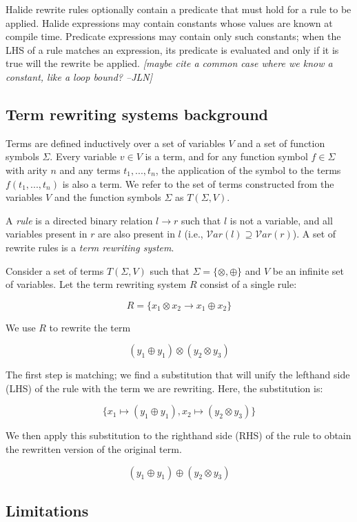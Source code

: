 \documentclass[sigplan,review,anonymous]{acmart}\settopmatter{printfolios=true,printccs=false,printacmref=false}
\newcommand{\jln}[1]{\textcolor{uwpurple}{\textit{[{#1} --JLN]}}}
\begin{document}
Halide rewrite rules optionally contain a predicate that must hold for a rule to be applied. Halide expressions may contain constants whose values are known at compile time. Predicate expressions may contain only such constants; when the LHS of a rule matches an expression, its predicate is evaluated and only if it is true will the rewrite be applied. \jln{maybe cite a common case where we know a constant, like a loop bound?}

\subsection{Term rewriting systems background}

Terms are defined inductively over a set of variables $V$ and a set of function symbols $\Sigma$. Every variable $v \in V$ is a term, and for any function symbol $f \in \Sigma$ with arity $n$ and any terms $t_1, ..., t_n$, the application of the symbol to the terms $f(t_1, ..., t_n)$ is also a term. We refer to the set of terms constructed from the variables $V$ and the function symbols $\Sigma$ as $T(\Sigma, V)$.

A \emph{rule} is a directed binary relation $l \rightarrow r$ such that $l$ is not a variable, and all variables present in $r$ are also present in $l$ (i.e., $\mathcal{V}ar(l) \supseteq \mathcal{V}ar(r)$). A set of rewrite rules is a \emph{term rewriting system}.

Consider a set of terms $T(\Sigma, V)$ such that $\Sigma = \{\otimes, \oplus\}$ and $V$ be an infinite set of variables. Let the term rewriting system $R$ consist of a single rule:

\[ R = \{ x_1 \otimes x_2 \rightarrow x_1 \oplus x_2 \} \]

We use $R$ to rewrite the term

\[ 
(y_1 \oplus y_1) \otimes (y_2 \otimes y_3)
\]

The first step is matching; we find a substitution that will unify the lefthand side (LHS) of the rule with the term we are rewriting. Here, the substitution is:

\[
\{ x_1 \mapsto (y_1 \oplus y_1), x_2 \mapsto (y_2 \otimes y_3) \}
\]

We then apply this substitution to the righthand side (RHS) of the rule to obtain the rewritten version of the original term.

\[ 
(y_1 \oplus y_1) \oplus (y_2 \otimes y_3)
\]

\subsection{Limitations}
\end{document}
